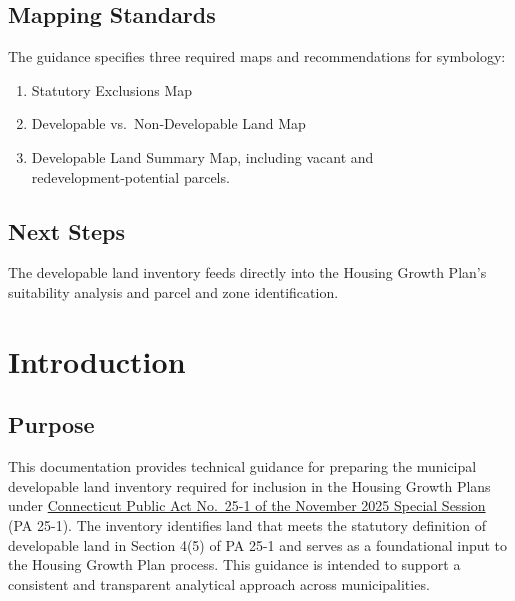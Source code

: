 \documentclass[
  letterpaper,
  DIV=11,
  numbers=noendperiod]{scrreprt}
\begin{document}
\section*{Mapping Standards}\label{mapping-standards}


The guidance specifies three required maps and recommendations for
symbology:

\begin{enumerate}
\def\labelenumi{\arabic{enumi}.}
\item
  Statutory Exclusions Map
\item
  Developable vs.~Non‑Developable Land Map
\item
  Developable Land Summary Map, including vacant and
  redevelopment‑potential parcels.
\end{enumerate}

\section*{Next Steps}\label{next-steps}


The developable land inventory feeds directly into the Housing Growth
Plan's suitability analysis and parcel and zone identification.


\chapter{Introduction}\label{introduction}

\section{Purpose}\label{purpose}

This documentation provides technical guidance for preparing the
municipal developable land inventory required for inclusion in the
Housing Growth Plans under
\href{https://www.cga.ct.gov/asp/cgabillstatus/cgabillstatus.asp?selBillType=Bill&which_year=2025&bill_num=8002}{Connecticut
Public Act No.~25-1 of the November 2025 Special Session} (PA 25-1). The
inventory identifies land that meets the statutory definition of
developable land in Section 4(5) of PA 25-1 and serves as a foundational
input to the Housing Growth Plan process. This guidance is intended to
support a consistent and transparent analytical approach across
municipalities.
\end{document}
